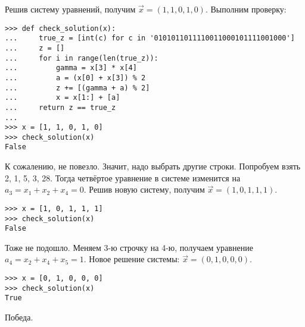 \documentclass[letterpaper,11pt,openany]{book}
\begin{document}
Решив систему уравнений, получим $\vec{x} = (1, 1, 0, 1, 0)$. Выполним проверку:

\begin{lstlisting}
>>> def check_solution(x):
... 	true_z = [int(c) for c in '0101011011110011000101111001000']
... 	z = []
... 	for i in range(len(true_z)):
... 		gamma = x[3] * x[4]
... 		a = (x[0] + x[3]) % 2
... 		z += [(gamma + a) % 2]
... 		x = x[1:] + [a]
... 	return z == true_z
... 
>>> x = [1, 1, 0, 1, 0]
>>> check_solution(x)
False
\end{lstlisting}

К сожалению, не повезло. Значит, надо выбрать другие строки. Попробуем взять 2, 1, 5, 3, 28. Тогда четвёртое уравнение в системе изменится на $a_3 = x_1 + x_2 + x_4 = 0$. Решив новую систему, получим $\vec{x} = (1, 0, 1, 1, 1)$.

\begin{lstlisting}
>>> x = [1, 0, 1, 1, 1]
>>> check_solution(x)
False
\end{lstlisting}

Тоже не подошло. Меняем 3-ю строчку на 4-ю, получаем уравнение $a_4 = x_2 + x_4 + x_5 = 1$. Новое решение системы: $\vec{x} = (0, 1, 0, 0, 0)$.

\begin{lstlisting}
>>> x = [0, 1, 0, 0, 0]
>>> check_solution(x)
True
\end{lstlisting}

Победа.
\end{document}
